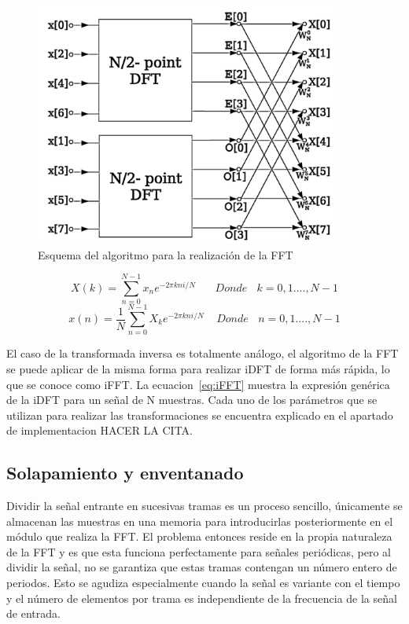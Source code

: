 \begin{figure}[!ht]
\begin{center}
\includegraphics[width=10cm]{img/dft.png}
\caption{\label{fig:fft}Esquema del algoritmo para la realización de la FFT}
\end{center}
\end{figure}

\begin{equation}
\label{eq:FFT}
X(k) =  \sum_{n = 0}^{N - 1} x_{n}e^{-2\pi kni/N}~~~~~~~~Donde~~~~k = 0, 1...., N-1
\end{equation}
\begin{equation}
\label{eq:iFFT}
x(n) = \frac{1}{N} \sum_{n = 0}^{N - 1} X_{k}e^{-2\pi kni/N}~~~~~Donde~~~~n = 0, 1...., N-1
\end{equation}

El caso de la transformada inversa es totalmente análogo, el algoritmo de la FFT se puede aplicar de la misma forma para realizar iDFT de forma más rápida, lo que se conoce como iFFT. La ecuacion~\ref{eq:iFFT} muestra la expresión genérica de la iDFT para un señal de N muestras. Cada uno de los parámetros que se utilizan para realizar las transformaciones se encuentra explicado en el apartado de implementacion HACER LA CITA.

\subsection{Solapamiento y enventanado}

Dividir la señal entrante en sucesivas tramas es un proceso sencillo, únicamente se almacenan las muestras en una memoria para introducirlas posteriormente en el módulo que realiza la FFT. El problema entonces reside en la propia naturaleza de la FFT y es que esta funciona perfectamente para señales periódicas, pero al dividir la señal, no se garantiza que estas tramas contengan un número entero de periodos. Esto se agudiza especialmente cuando la señal es variante con el tiempo y el número de elementos por trama es independiente de la frecuencia de la señal de entrada.

